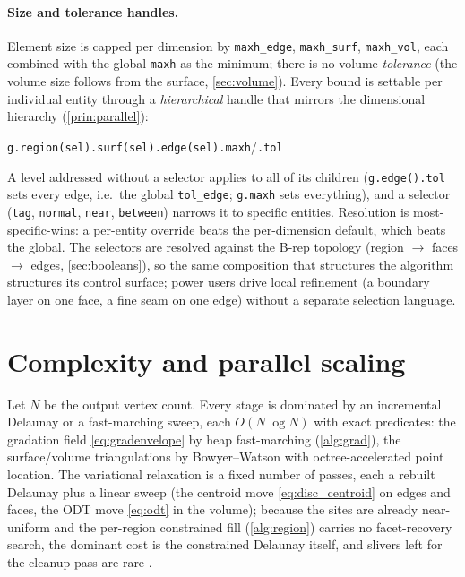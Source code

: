 \documentclass[11pt,a4paper]{article}
\numberwithin{equation}{section}
\DeclareRobustCommand{\code}[1]{\texttt{#1}}
\begin{document}
\paragraph{Size and tolerance handles.}
Element size is capped per dimension by \code{maxh\_edge}, \code{maxh\_surf},
\code{maxh\_vol}, each combined with the global \code{maxh} as the minimum; there
is no volume \emph{tolerance} (the volume size follows from the surface,
\cref{sec:volume}). Every bound is settable per individual entity through a
\emph{hierarchical} handle that mirrors the dimensional hierarchy
(\cref{prin:parallel}):
\begin{center}
\code{g.region(sel).surf(sel).edge(sel).maxh}\quad/\quad\code{.tol}
\end{center}
A level addressed without a selector applies to all of its children
(\code{g.edge().tol} sets every edge, i.e.\ the global \code{tol\_edge};
\code{g.maxh} sets everything), and a selector (\code{tag}, \code{normal},
\code{near}, \code{between}) narrows it to specific entities. Resolution is
most-specific-wins: a per-entity override beats the per-dimension default, which
beats the global. The selectors are resolved against the B-rep topology (region
$\to$ faces $\to$ edges, \cref{sec:booleans}), so the same composition that
structures the algorithm structures its control surface; power users drive local
refinement (a boundary layer on one face, a fine seam on one edge) without a
separate selection language.

\section{Complexity and parallel scaling}
Let $N$ be the output vertex count. Every stage is dominated by an incremental
Delaunay or a fast-marching sweep, each $O(N\log N)$ with exact predicates: the
gradation field \eqref{eq:gradenvelope} by heap fast-marching (\cref{alg:grad}),
the surface/volume triangulations by Bowyer--Watson with octree-accelerated point
location. The variational relaxation is a fixed number of passes, each a rebuilt Delaunay
plus a linear sweep (the centroid move \eqref{eq:disc_centroid} on edges and
faces, the ODT move \eqref{eq:odt} in the volume);
because the sites are already near-uniform and the per-region constrained fill
(\cref{alg:region}) carries no facet-recovery search, the dominant cost is the
constrained Delaunay itself, and slivers left for the cleanup pass are rare
\cite{AlliezCohenSteiner2005,TournoisAlliez2009}.
\end{document}
